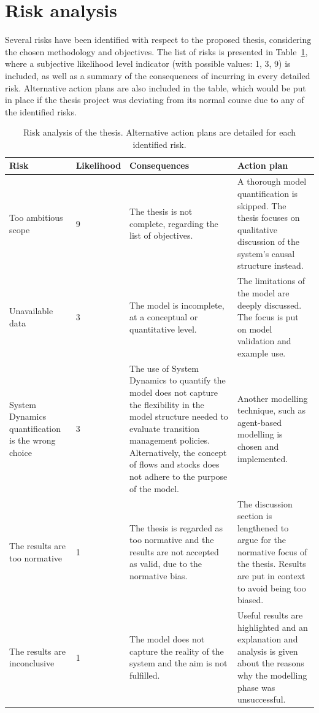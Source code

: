 \documentclass[a4paper,fontsize=11pt,bibliography=totoc]{scrartcl}
\newcommand{\tref}[1]{Table~\ref{#1}}
\begin{document}
\section{Risk analysis}
Several risks have been identified with respect to the proposed thesis, considering the chosen methodology and objectives. The list of risks is presented in \tref{t:risks}, where a subjective likelihood level indicator (with possible values: 1, 3, 9) is included, as well as a summary of the consequences of incurring in every detailed risk. Alternative action plans are also included in the table, which would be put in place if the thesis project was deviating from its normal course due to any of the identified risks.

\begin{table}
\centering
\footnotesize
\caption{Risk analysis of the thesis. Alternative action plans are detailed for each identified risk.}
\label{t:risks}
\begin{tabular}{p{2.5cm}p{1.5cm}p{4.5cm}p{4.5cm}}
\toprule
Risk & Likelihood & Consequences & Action plan \\
\midrule
Too ambitious scope & 9 & The thesis is not complete, regarding the list of objectives. & A thorough model quantification is skipped. The thesis focuses on qualitative discussion of the system's causal structure instead. \\[0.5em]
Unavailable data & 3 & The model is incomplete, at a conceptual or quantitative level. & The limitations of the model are deeply discussed. The focus is put on model validation and example use. \\[0.5em]
System Dynamics quantification is the wrong choice & 3 & The use of System Dynamics to quantify the model does not capture the flexibility in the model structure needed to evaluate transition management policies. Alternatively, the concept of flows and stocks does not adhere to the purpose of the model. & Another modelling technique, such as agent-based modelling is chosen and implemented. \\[0.5em]
The results are too normative & 1 & The thesis is regarded as too normative and the results are not accepted as valid, due to the normative bias. & The discussion section is lengthened to argue for the normative focus of the thesis. Results are put in context to avoid being too biased. \\[0.5em]
The results are inconclusive & 1 & The model does not capture the reality of the system and the aim is not fulfilled. & Useful results are highlighted and an explanation and analysis is given about the reasons why the modelling phase was unsuccessful. \\
\bottomrule
\end{tabular}
\end{table}

\printbibliography
\end{document}
